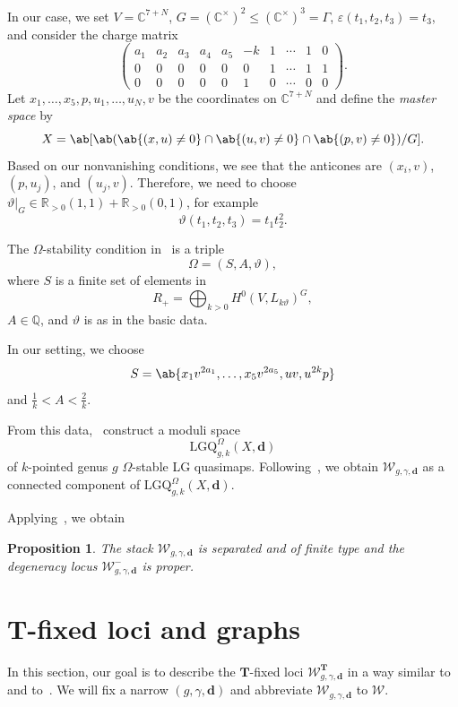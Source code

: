 \documentclass{amsart}
\newtheorem{prop}[thm]{Proposition}
\theoremstyle{definition}
\theoremstyle{remark}
\theoremstyle{plain}
\theoremstyle{definition}
\theoremstyle{remark}
\newcommand{\R}{\mathbb{R}}
\newcommand{\C}{\mathbb{C}}
\newcommand{\Q}{\mathbb{Q}}
\newcommand{\T}{\mathbf{T}}
\newcommand{\ep}{\varepsilon}
\newcommand{\mc}[1]{\mathcal{#1}}
\newcommand{\mbf}[1]{\mathbf{#1}}
\newcommand{\mr}[1]{\mathrm{#1}}
\newcommand{\1}{\mathbf{1}}
\newcommand{\2}{\mathbf{2}}
\newcommand{\3}{\mathbf{3}}
\begin{document}
In our case, we set $V = \C^{7+N}$, $G = (\C^{\times})^2 \leq (\C^{\times})^3 = \Gamma$, $\ep(t_1, t_2, t_3) = t_3$, and consider the charge matrix
\[ \begin{pmatrix}
  a_1 & a_2 & a_3 & a_4 & a_5 & -k & 1 & \cdots & 1 & 0 \\
  0 & 0 & 0 & 0 & 0 & 0 & 1 & \cdots & 1 & 1 \\
  0 & 0 & 0 & 0 & 0 & 1 & 0 & \cdots & 0 & 0
\end{pmatrix}. \]
Let $x_1, \ldots, x_5, p, u_1, \ldots, u_N, v$ be the coordinates on $\C^{7+N}$ and define the \textit{master space} by
\[ X = \ab[ \ab(\ab\{(x, u) \neq 0\} \cap \ab\{(u,v) \neq 0\} \cap \ab\{(p,v) \neq 0\}) / G ]. \]
Based on our nonvanishing conditions, we see that the anticones are $(x_i, v)$, $(p,u_j)$, and $(u_j, v)$. Therefore, we need to choose $\vartheta|_G \in \R_{>0} (1,1) + \R_{>0} (0,1)$, for example
\[ \vartheta(t_1, t_2, t_3) = t_1t_2^2. \]

The $\Omega$-stability condition in~\cite{generalmsp} is a triple
\[ \Omega = (S, A, \vartheta), \]
where $S$ is a finite set of elements in
\[ R_+ = \bigoplus_{k > 0} H^0(V, L_{k\vartheta})^G, \]
$A \in \Q$, and $\vartheta$ is as in the basic data.

In our setting, we choose
\[ S = \ab\{x_1 v^{2 a_1}, \ldots, x_5 v^{2 a_5}, uv, u^{2k} p\}\]
and $\frac{1}{k} < A < \frac{2}{k}$.

From this data,~\cite{generalmsp} construct a moduli space
\[ \mr{LGQ}_{g,k}^{\Omega}(X,\mbf{d})\]
of $k$-pointed genus $g$ $\Omega$-stable LG quasimaps. Following~\cite[Appendix A]{generalmsp}, we obtain $\mc{W}_{g,\gamma,\mbf{d}}$ as a connected component of $\mr{LGQ}_{g,k}^{\Omega}(X,\mbf{d})$.

Applying~\cite[Theorem 2.4, Theorem 2.5]{generalmsp}, we obtain
\begin{prop}\label{prop:properness}
    The stack $\mc{W}_{g,\gamma,\mbf{d}}$ is separated and of finite type and the degeneracy locus $\mc{W}^-_{g,\gamma,\mbf{d}}$ is proper.
\end{prop}



\section{$\T$-fixed loci and graphs}
\label{sec:T fixed loci and graphs}

In this section, our goal is to describe the $\T$-fixed loci $\mc{W}_{g,\gamma,\mbf{d}}^{\T}$ in a way similar to~\cite[\S 4]{nmsp} and to~\cite{msp2}. We will fix a narrow $(g,\gamma,\mbf{d})$ and abbreviate $\mc{W}_{g,\gamma,\mbf{d}}$ to $\mc{W}$.
\end{document}
